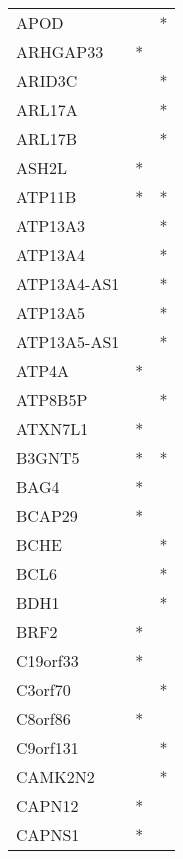 \begin{longtable}{lcc}
APOD             &                &          * \\
ARHGAP33         &              * &            \\
ARID3C           &                &          * \\
ARL17A           &                &          * \\
ARL17B           &                &          * \\
ASH2L            &              * &            \\
ATP11B           &              * &          * \\
ATP13A3          &                &          * \\
ATP13A4          &                &          * \\
ATP13A4-AS1      &                &          * \\
ATP13A5          &                &          * \\
ATP13A5-AS1      &                &          * \\
ATP4A            &              * &            \\
ATP8B5P          &                &          * \\
ATXN7L1          &              * &            \\
B3GNT5           &              * &          * \\
BAG4             &              * &            \\
BCAP29           &              * &            \\
BCHE             &                &          * \\
BCL6             &                &          * \\
BDH1             &                &          * \\
BRF2             &              * &            \\
C19orf33         &              * &            \\
C3orf70          &                &          * \\
C8orf86          &              * &            \\
C9orf131         &                &          * \\
CAMK2N2          &                &          * \\
CAPN12           &              * &            \\
CAPNS1           &              * &            \\

\end{longtable}
